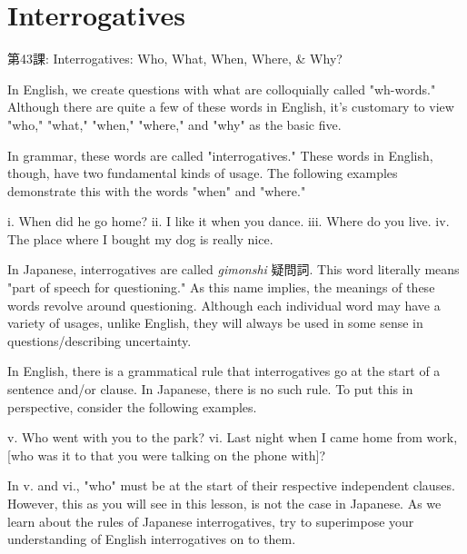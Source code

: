     
\chapter{Interrogatives}

\begin{center}
\begin{Large}
第43課: Interrogatives: Who, What, When, Where, \& Why? 
\end{Large}
\end{center}
 
\par{ In English, we create questions with what are colloquially called "wh-words." Although there are quite a few of these words in English, it's customary to view "who," "what," "when," "where," and "why" as the basic five. }

\par{ In grammar, these words are called "interrogatives." These words in English, though, have two fundamental kinds of usage. The following examples demonstrate this with the words "when" and "where." }

\par{i. When did he go home? \hfill\break
ii. I like it when you dance. \hfill\break
iii. Where do you live. \hfill\break
iv. The place where I bought my dog is really nice. }

\par{ In Japanese, interrogatives are called \emph{gimonshi }疑問詞. This word literally means "part of speech for questioning." As this name implies, the meanings of these words revolve around questioning. Although each individual word may have a variety of usages, unlike English, they will always be used in some sense in questions\slash describing uncertainty. }

\par{ In English, there is a grammatical rule that interrogatives go at the start of a sentence and\slash or clause. In Japanese, there is no such rule. To put this in perspective, consider the following examples. }

\par{v. Who went with you to the park? \hfill\break
vi. Last night when I came home from work, [who was it to that you were talking on the phone with]? }

\par{ In v. and vi., "who" must be at the start of their respective independent clauses. However, this as you will see in this lesson, is not the case in Japanese. As we learn about the rules of Japanese interrogatives, try to superimpose your understanding of English interrogatives on to them. }

